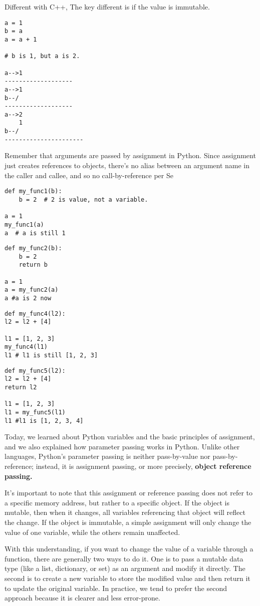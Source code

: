 \documentclass[a4paper,12pt,twoside]{book}
\begin{document}
Different with C++, The key different is if the value is immutable.
\begin{lstlisting}
a = 1
b = a
a = a + 1

# b is 1, but a is 2. 

a-->1
-------------------
a-->1
b--/
-------------------
a-->2
    1
b--/
----------------------
\end{lstlisting}

Remember that arguments are passed by assignment in Python. Since assignment just creates references to objects, there’s no alias between an argument name in the caller and callee, and so no call-by-reference per Se
\begin{lstlisting}
def my_func1(b):
	b = 2  # 2 is value, not a variable.

a = 1
my_func1(a)
a  # a is still 1
\end{lstlisting}

\begin{lstlisting}
def my_func2(b):
	b = 2
	return b

a = 1
a = my_func2(a)
a #a is 2 now
\end{lstlisting}

\begin{lstlisting}
def my_func4(l2):
l2 = l2 + [4]

l1 = [1, 2, 3]
my_func4(l1)
l1 # l1 is still [1, 2, 3]
\end{lstlisting}

\begin{lstlisting}
def my_func5(l2):
l2 = l2 + [4]
return l2

l1 = [1, 2, 3]
l1 = my_func5(l1)
l1 #l1 is [1, 2, 3, 4]
\end{lstlisting}

Today, we learned about Python variables and the basic principles of assignment, and we also explained how parameter passing works in Python. Unlike other languages, Python’s parameter passing is neither pass-by-value nor pass-by-reference; instead, it is assignment passing, or more precisely, \textbf{object reference passing.}


It’s important to note that this assignment or reference passing does not refer to a specific memory address, but rather to a specific object. If the object is mutable, then when it changes, all variables referencing that object will reflect the change. If the object is immutable, a simple assignment will only change the value of one variable, while the others remain unaffected.


With this understanding, if you want to change the value of a variable through a function, there are generally two ways to do it. One is to pass a mutable data type (like a list, dictionary, or set) as an argument and modify it directly. The second is to create a new variable to store the modified value and then return it to update the original variable. In practice, we tend to prefer the second approach because it is clearer and less error-prone.
\end{document}
